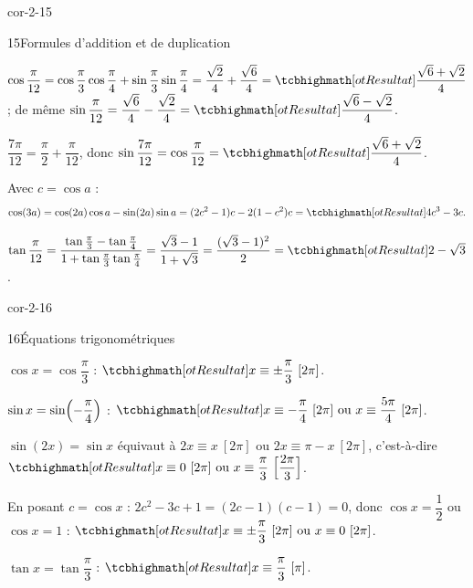 \begin{blocLivre}{cor-2-15}
\begin{corrige}{15}{Formules d'addition et de duplication}
\begin{questions}
  \item $\cos\dfrac{\pi}{12}=\cos\dfrac{\pi}{3}\cos\dfrac{\pi}{4}+\sin\dfrac{\pi}{3}\sin\dfrac{\pi}{4}
    =\dfrac{\sqrt2}{4}+\dfrac{\sqrt6}{4}=\res{\dfrac{\sqrt6+\sqrt2}{4}}$ ;
    de même $\sin\dfrac{\pi}{12}=\dfrac{\sqrt6}{4}-\dfrac{\sqrt2}{4}
    =\res{\dfrac{\sqrt6-\sqrt2}{4}}$.
  \item $\dfrac{7\pi}{12}=\dfrac{\pi}{2}+\dfrac{\pi}{12}$, donc
    $\sin\dfrac{7\pi}{12}=\cos\dfrac{\pi}{12}=\res{\dfrac{\sqrt6+\sqrt2}{4}}$.
  \item Avec $c=\cos a$ :
    \[
      \cos(3a)=\cos(2a)\cos a-\sin(2a)\sin a
      =(2c^{2}-1)c-2(1-c^{2})c=\res{4c^{3}-3c}.
    \]
  \item $\tan\dfrac{\pi}{12}=\dfrac{\tan\frac{\pi}{3}-\tan\frac{\pi}{4}}{1+\tan\frac{\pi}{3}\tan\frac{\pi}{4}}
    =\dfrac{\sqrt3-1}{1+\sqrt3}=\dfrac{(\sqrt3-1)^{2}}{2}=\res{2-\sqrt3}$.
\end{questions}
\end{corrige}
\end{blocLivre}

\begin{blocLivre}{cor-2-16}
\begin{corrige}{16}{Équations trigonométriques}
\begin{questions}
  \item $\cos x=\cos\dfrac{\pi}{3}$ :
    $\res{x\equiv\pm\dfrac{\pi}{3}\ [2\pi]}$.
  \item $\sin x=\sin\Bigl(-\dfrac{\pi}{4}\Bigr)$ :
    $\res{x\equiv-\dfrac{\pi}{4}\ [2\pi]\ \text{ou}\ x\equiv\dfrac{5\pi}{4}\ [2\pi]}$.
  \item $\sin(2x)=\sin x$ équivaut à $2x\equiv x\ [2\pi]$ ou $2x\equiv\pi-x\ [2\pi]$,
    c'est-à-dire $\res{x\equiv0\ [2\pi]\ \text{ou}\ x\equiv\dfrac{\pi}{3}\ \Bigl[\dfrac{2\pi}{3}\Bigr]}$.
  \item En posant $c=\cos x$ : $2c^{2}-3c+1=(2c-1)(c-1)=0$, donc
    $\cos x=\dfrac12$ ou $\cos x=1$ :
    $\res{x\equiv\pm\dfrac{\pi}{3}\ [2\pi]\ \text{ou}\ x\equiv0\ [2\pi]}$.
  \item $\tan x=\tan\dfrac{\pi}{3}$ : $\res{x\equiv\dfrac{\pi}{3}\ [\pi]}$.
\end{questions}
\end{corrige}
\end{blocLivre}

